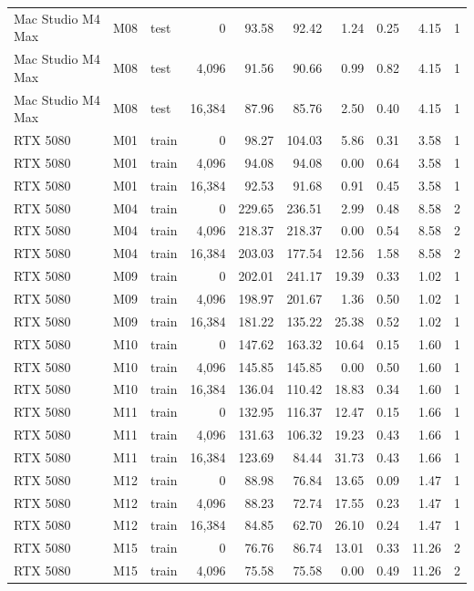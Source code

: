 \documentclass[10pt]{article}
\begin{document}
\begin{landscape}
\begin{longtable}{@{}l l l r r r r r r r@{}}
Mac Studio M4 Max & M08 & test & 0 & 93.58 & 92.42 & 1.24 & 0.25 & 4.15 & 1 \\
Mac Studio M4 Max & M08 & test & 4,096 & 91.56 & 90.66 & 0.99 & 0.82 & 4.15 & 1 \\
Mac Studio M4 Max & M08 & test & 16,384 & 87.96 & 85.76 & 2.50 & 0.40 & 4.15 & 1 \\
RTX 5080 & M01 & train & 0 & 98.27 & 104.03 & 5.86 & 0.31 & 3.58 & 1 \\
RTX 5080 & M01 & train & 4,096 & 94.08 & 94.08 & 0.00 & 0.64 & 3.58 & 1 \\
RTX 5080 & M01 & train & 16,384 & 92.53 & 91.68 & 0.91 & 0.45 & 3.58 & 1 \\
RTX 5080 & M04 & train & 0 & 229.65 & 236.51 & 2.99 & 0.48 & 8.58 & 2 \\
RTX 5080 & M04 & train & 4,096 & 218.37 & 218.37 & 0.00 & 0.54 & 8.58 & 2 \\
RTX 5080 & M04 & train & 16,384 & 203.03 & 177.54 & 12.56 & 1.58 & 8.58 & 2 \\
RTX 5080 & M09 & train & 0 & 202.01 & 241.17 & 19.39 & 0.33 & 1.02 & 1 \\
RTX 5080 & M09 & train & 4,096 & 198.97 & 201.67 & 1.36 & 0.50 & 1.02 & 1 \\
RTX 5080 & M09 & train & 16,384 & 181.22 & 135.22 & 25.38 & 0.52 & 1.02 & 1 \\
RTX 5080 & M10 & train & 0 & 147.62 & 163.32 & 10.64 & 0.15 & 1.60 & 1 \\
RTX 5080 & M10 & train & 4,096 & 145.85 & 145.85 & 0.00 & 0.50 & 1.60 & 1 \\
RTX 5080 & M10 & train & 16,384 & 136.04 & 110.42 & 18.83 & 0.34 & 1.60 & 1 \\
RTX 5080 & M11 & train & 0 & 132.95 & 116.37 & 12.47 & 0.15 & 1.66 & 1 \\
RTX 5080 & M11 & train & 4,096 & 131.63 & 106.32 & 19.23 & 0.43 & 1.66 & 1 \\
RTX 5080 & M11 & train & 16,384 & 123.69 & 84.44 & 31.73 & 0.43 & 1.66 & 1 \\
RTX 5080 & M12 & train & 0 & 88.98 & 76.84 & 13.65 & 0.09 & 1.47 & 1 \\
RTX 5080 & M12 & train & 4,096 & 88.23 & 72.74 & 17.55 & 0.23 & 1.47 & 1 \\
RTX 5080 & M12 & train & 16,384 & 84.85 & 62.70 & 26.10 & 0.24 & 1.47 & 1 \\
RTX 5080 & M15 & train & 0 & 76.76 & 86.74 & 13.01 & 0.33 & 11.26 & 2 \\
RTX 5080 & M15 & train & 4,096 & 75.58 & 75.58 & 0.00 & 0.49 & 11.26 & 2 \\

\end{longtable}
\end{landscape}
\end{document}
